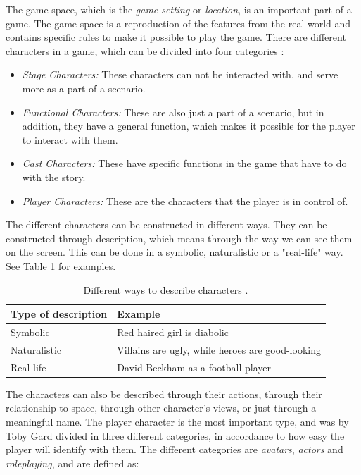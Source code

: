 The game space, which is the \emph{game setting} or \emph{location}, is an important part of a game. The game space is a reproduction of the features from the real world and contains specific rules to make it possible to play the game. There are different characters in a game, which can be divided into four categories \cite{understandingvg}: 

\begin{itemize}
\item \emph{Stage Characters:} These characters can not be interacted with, and serve more as a part of a scenario. \\
\item \emph{Functional Characters:} These are also just a part of a scenario, but in addition, they have a general function, which makes it possible for the player to interact with them. \\
\item \emph{Cast Characters:} These have specific functions in the game that have to do with the story. \\
\item \emph{Player Characters:} These are the characters that the player is in control of. 
\end{itemize}

The different characters can be constructed in different ways. They can be constructed through description, which means through the way we can see them on the screen. This can be done in a symbolic, naturalistic or a "real-life" way. See Table \ref{tab:description} for examples.

\begin{table} [H]
\centering
    \begin{tabular}{|l|l|}
        \hline
        \textbf{Type of description} & \textbf{Example} \\ \hline
       Symbolic & Red haired girl is diabolic  \\ \hline
       Naturalistic & Villains are ugly, while heroes are good-looking \\ \hline
       Real-life & David Beckham as a football player \\ \hline
    \end{tabular}
    \caption[Different ways to describe characters]{Different ways to describe characters \cite{understandingvg}.}
    \label{tab:description}
\end{table} 

The characters can also be described through their actions, through their relationship to space, through other character’s views, or just through a meaningful name. The player character is the most important type, and was by Toby Gard divided in three different categories, in accordance to how easy the player will identify with them. The different categories are \emph{avatars}, \emph{actors} and \emph{roleplaying}, and are defined as:

